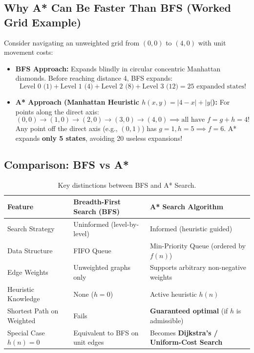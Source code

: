 \subsection{Why A* Can Be Faster Than BFS (Worked Grid Example)}
Consider navigating an unweighted grid from $(0, 0)$ to $(4, 0)$ with unit movement costs:
\begin{itemize}
    \item \textbf{BFS Approach:} Expands blindly in circular concentric Manhattan diamonds. Before reaching distance 4, BFS expands:
    \[
    \text{Level 0 (1)} + \text{Level 1 (4)} + \text{Level 2 (8)} + \text{Level 3 (12)} = \boxed{25 \text{ expanded states!}}
    \]
    \item \textbf{A* Approach (Manhattan Heuristic $h(x, y) = |4-x| + |y|$):}
    For points along the direct axis:
    \[
    (0,0) \to (1,0) \to (2,0) \to (3,0) \to (4,0) \implies \text{all have } f = g + h = 4!
    \]
    Any point off the direct axis (e.g., $(0, 1)$) has $g=1, h=5 \implies f=6$. A* expands \textbf{only 5 states}, avoiding 20 useless expansions!
\end{itemize}

\subsection{Comparison: BFS vs A*}

\begin{table}[htbp]
\centering
\small
\begin{tabularx}{\textwidth}{p{3.5cm} X X}
\toprule
\textbf{Feature} & \textbf{Breadth-First Search (BFS)} & \textbf{A* Search Algorithm} \\
\midrule
Search Strategy & Uninformed (level-by-level) & Informed (heuristic guided) \\
Data Structure & FIFO Queue & Min-Priority Queue (ordered by $f(n)$) \\
Edge Weights & Unweighted graphs only & Supports arbitrary non-negative weights \\
Heuristic Knowledge & None ($h=0$) & Active heuristic $h(n)$ \\
Shortest Path on Weighted & Fails & \textbf{Guaranteed optimal} (if $h$ is admissible) \\
Special Case $h(n) = 0$ & Equivalent to BFS on unit edges & Becomes \textbf{Dijkstra's / Uniform-Cost Search} \\
\bottomrule
\end{tabularx}
\caption{Key distinctions between BFS and A* Search.}
\end{table}

